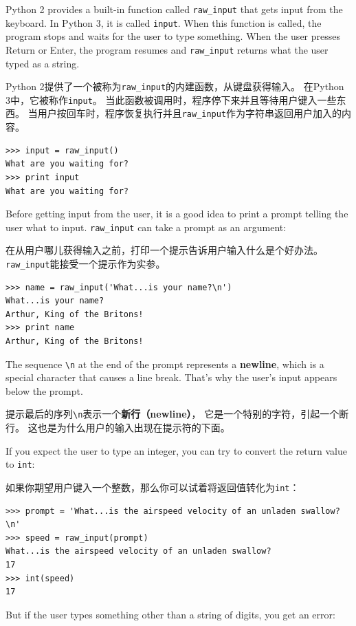 \documentclass[10pt]{book}
\begin{document}
\begin{CJK}{UTF8}{gbsn}
Python 2 provides a built-in function called \verb"raw_input" that gets
input from the keyboard.  In Python 3, it is called
  {\tt input}.  When this function is called, the program stops and
waits for the user to type something.  When the user presses {\sf
  Return} or {\sf Enter}, the program resumes and \verb"raw_input"
returns what the user typed as a string.

Python 2提供了一个被称为\verb"raw_input"的内建函数，从键盘获得输入。
在Python 3中，它被称作{\tt input}。
当此函数被调用时，程序停下来并且等待用户键入一些东西。
当用户按回车时，程序恢复执行并且\verb"raw_input"作为字符串返回用户加入的内容。

\begin{verbatim}
>>> input = raw_input()
What are you waiting for?
>>> print input
What are you waiting for?
\end{verbatim}
%
Before getting input from the user, it is a good idea to print a
prompt telling the user what to input.  \verb"raw_input" can take a
prompt as an argument:

在从用户哪儿获得输入之前，打印一个提示告诉用户输入什么是个好办法。
\verb"raw_input"能接受一个提示作为实参。

\begin{verbatim}
>>> name = raw_input('What...is your name?\n')
What...is your name?
Arthur, King of the Britons!
>>> print name
Arthur, King of the Britons!
\end{verbatim}
%
The sequence \verb"\n" at the end of the prompt represents a {\bf newline},
which is a special character that causes a line break.
That's why the user's input appears below the prompt.

提示最后的序列\verb"\n"表示一个{\bf 新行（newline）}，
它是一个特别的字符，引起一个断行。
这也是为什么用户的输入出现在提示符的下面。

If you expect the user to type an integer, you can try to convert
the return value to {\tt int}:

如果你期望用户键入一个整数，那么你可以试着将返回值转化为{\tt int}：

\begin{verbatim}
>>> prompt = 'What...is the airspeed velocity of an unladen swallow?\n'
>>> speed = raw_input(prompt)
What...is the airspeed velocity of an unladen swallow?
17
>>> int(speed)
17
\end{verbatim}
%
But if the user types something other than a string of digits,
you get an error:


\end{CJK}
\end{document}
